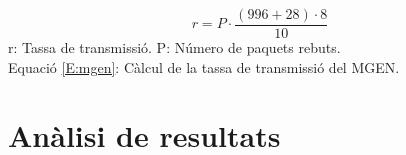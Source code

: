 \begin{minipage}[htb]{\linewidth}
\begin{equation}\label{E:mgen}
r=P\cdot\frac{(996+28)\cdot8}{10}
\end{equation}
\centering
{\scriptsize
r: Tassa de transmissió. 
P: Número de paquets rebuts. 
}\\
Equació \ref{E:mgen}: Càlcul de la tassa de transmissió del MGEN.
\end{minipage}

\section{Anàlisi de resultats}
